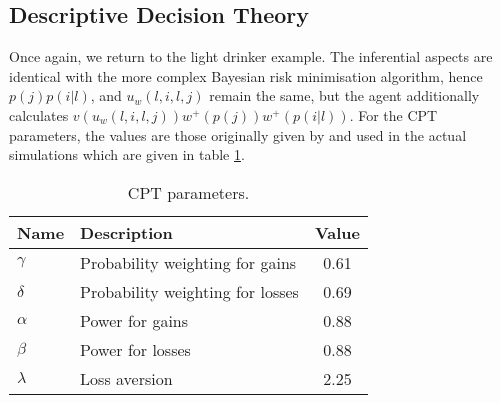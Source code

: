 \subsection{Descriptive Decision Theory}
\label{sub:cpt_eg}

Once again, we return to the light drinker example.  The inferential aspects are identical with the more complex Bayesian risk minimisation algorithm, hence \(p(j)p(i | l)\), and \(u_{w}(l, i, l, j)\) remain the same, but the agent additionally calculates $v(u_{w}(l, i, l, j))w^{+}(p(j))w^{+}(p(i | l))$. For the \ac{CPT} parameters, the values are those originally given by \citet{Tversky1992} and used in the actual simulations which are given in table \ref{tab:cpt_params}.

\begin{table}
\caption{\ac{CPT} parameters. \label{tab:cpt_params}}
\begin{tabular}{|l | l | c|}
\hline
Name & Description & Value \\ \hline
\(\gamma\) & Probability weighting for gains  & 0.61 \\ \hline
\(\delta\) & Probability weighting for losses &  0.69\\ \hline
\(\alpha\) & Power for gains  & 0.88 \\ \hline
\(\beta\) & Power for losses & 0.88 \\ \hline
\(\lambda\) & Loss aversion &  2.25 \\ \hline
\end{tabular}
\end{table}

